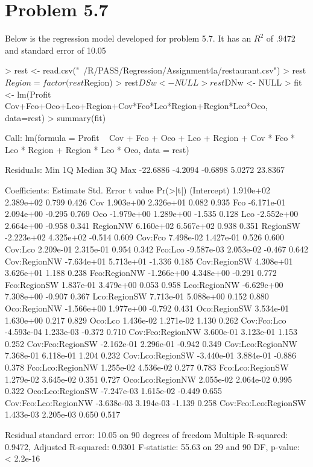 \documentclass{article}
\begin{document}
\section*{Problem 5.7}
Below is the regression model developed for problem 5.7. It has an $R^2$ of .9472 and standard error of 10.05

\begin{Schunk}
\begin{Sinput}
> rest <- read.csv("~/R/PASS/Regression/Assignment4a/restaurant.csv")
> rest$Region = factor(rest$Region)
> rest$DSw <- NULL
> rest$DNw <- NULL
> fit <- lm(Profit ~ Cov+Fco+Oco+Lco+Region+Cov*Fco*Lco*Region+Region*Lco*Oco, data=rest)
> summary(fit)
\end{Sinput}
\begin{Soutput}
Call:
lm(formula = Profit ~ Cov + Fco + Oco + Lco + Region + Cov * 
    Fco * Lco * Region + Region * Lco * Oco, data = rest)

Residuals:
     Min       1Q   Median       3Q      Max 
-22.6886  -4.2094  -0.6898   5.0272  23.8367 

Coefficients:
                       Estimate Std. Error t value Pr(>|t|)
(Intercept)           1.910e+02  2.389e+02   0.799    0.426
Cov                   1.903e+00  2.326e+01   0.082    0.935
Fco                  -6.171e-01  2.094e+00  -0.295    0.769
Oco                  -1.979e+00  1.289e+00  -1.535    0.128
Lco                  -2.552e+00  2.664e+00  -0.958    0.341
RegionNW              6.160e+02  6.567e+02   0.938    0.351
RegionSW             -2.223e+02  4.325e+02  -0.514    0.609
Cov:Fco               7.498e-02  1.427e-01   0.526    0.600
Cov:Lco               2.209e-01  2.315e-01   0.954    0.342
Fco:Lco              -9.587e-03  2.053e-02  -0.467    0.642
Cov:RegionNW         -7.634e+01  5.713e+01  -1.336    0.185
Cov:RegionSW          4.308e+01  3.626e+01   1.188    0.238
Fco:RegionNW         -1.266e+00  4.348e+00  -0.291    0.772
Fco:RegionSW          1.837e-01  3.479e+00   0.053    0.958
Lco:RegionNW         -6.629e+00  7.308e+00  -0.907    0.367
Lco:RegionSW          7.713e-01  5.088e+00   0.152    0.880
Oco:RegionNW         -1.566e+00  1.977e+00  -0.792    0.431
Oco:RegionSW          3.534e-01  1.630e+00   0.217    0.829
Oco:Lco               1.436e-02  1.271e-02   1.130    0.262
Cov:Fco:Lco          -4.593e-04  1.233e-03  -0.372    0.710
Cov:Fco:RegionNW      3.600e-01  3.123e-01   1.153    0.252
Cov:Fco:RegionSW     -2.162e-01  2.296e-01  -0.942    0.349
Cov:Lco:RegionNW      7.368e-01  6.118e-01   1.204    0.232
Cov:Lco:RegionSW     -3.440e-01  3.884e-01  -0.886    0.378
Fco:Lco:RegionNW      1.255e-02  4.536e-02   0.277    0.783
Fco:Lco:RegionSW      1.279e-02  3.645e-02   0.351    0.727
Oco:Lco:RegionNW      2.055e-02  2.064e-02   0.995    0.322
Oco:Lco:RegionSW     -7.247e-03  1.615e-02  -0.449    0.655
Cov:Fco:Lco:RegionNW -3.638e-03  3.194e-03  -1.139    0.258
Cov:Fco:Lco:RegionSW  1.433e-03  2.205e-03   0.650    0.517

Residual standard error: 10.05 on 90 degrees of freedom
Multiple R-squared:  0.9472,	Adjusted R-squared:  0.9301 
F-statistic: 55.63 on 29 and 90 DF,  p-value: < 2.2e-16
\end{Soutput}
\end{Schunk}
\end{document}
